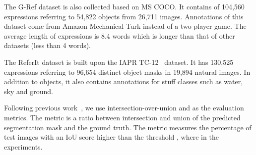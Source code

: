 \documentclass[10pt,twocolumn,letterpaper]{article}
\begin{document}
The G-Ref dataset is also collected based on MS COCO. It contains of 104,560 expressions referring to 54,822 objects from 26,711 images. Annotations of this dataset come from Amazon Mechanical Turk instead of a two-player game. The average length of expressions is 8.4 words which is longer than that of other datasets (less than 4 words). 

The ReferIt dataset is built upon the IAPR TC-12~\cite{escalante2010segmented} dataset. It has 130,525 expressions referring to 96,654 distinct object masks in 19,894 natural images. In addition to objects, it also contains annotations for stuff classes such as water, sky and ground.

 Following previous work~\cite{li2018referring,liu2017recurrent, shi2018key}, we use intersection-over-union  and  as the evaluation metrics. The  metric is a ratio between intersection and union of the predicted segmentation mask and the ground truth. The  metric measures the percentage of test images with an IoU score higher than the threshold , where  in the experiments.  
\end{document}

